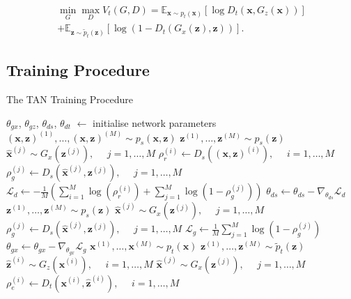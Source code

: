\documentclass{article}
\begin{document}
\begin{equation}
\begin{split}
\min_{G} \max_{D} V_t(G, D) = \mathbb{E}_{\bm{x}\sim p_{t}(\bm{x})}[\log D_t(\bm{x}, G_z(\bm{x}))]\\
+  \mathbb{E}_{\bm{z}\sim \widetilde{p}_{t}(\bm{z})}[\log (1 - D_t(G_x(\bm{z}), \bm{z}))].
\end{split}
\end{equation}

\subsection{Training Procedure}

\begin{algorithm}[tb]
   \caption{The TAN Training Procedure}
   \label{alg:example}
\begin{algorithmic}
   \STATE $\theta_{gx}$, $\theta_{gz}$, $\theta_{ds}$, $\theta_{dt}$ $\leftarrow$ initialise network parameters
   \REPEAT
   		\STATE $(\bm{x},\bm{z})^{(1)}, \dots, (\bm{x},\bm{z})^{(M)} \sim p_s(\bm{x},\bm{z})$ 
		\STATE $\bm{z}^{(1)}, \dots, \bm{z}^{(M)} \sim p_s(\bm{z})$
		\STATE $\hat{\bm{x}}^{(j)} \sim G_x \left(\bm{z}^{(j)}\right), \ \ \ \ \ \ j = 1, \dots, M $ 
		\STATE $\rho_r^{(i)} \leftarrow D_s\left((\bm{x},\bm{z})^{(i)}\right), \ \ \ \ \ \ i = 1, \dots, M $ 
		\STATE $\rho_g^{(j)} \leftarrow D_s\left(\hat{\bm{x}}^{(j)}, \bm{z}^{(j)}\right), \ \ \ \ \ \ j = 1, \dots, M $
		\STATE $\mathcal{L}_d \leftarrow -\frac{1}{M} \left( \sum_{i=1}^{M} \log \left( \rho_r^{(i)} \right) + \sum_{j=1}^{M} \log \left( 1 - \rho_g^{(j)} \right) \right)$
		\STATE $\theta_{ds} \leftarrow \theta_{ds} - \nabla_{\theta_{ds}}\mathcal{L}_d$
	\ENDFOR
	\STATE $\bm{z}^{(1)}, \dots, \bm{z}^{(M)} \sim p_s(\bm{z})$
	\STATE $\hat{\bm{x}}^{(j)} \sim G_x \left(\bm{z}^{(j)}\right), \ \ \ \ \ \ j = 1, \dots, M $ 
	\STATE $\rho_g^{(j)} \leftarrow D_s\left(\hat{\bm{x}}^{(j)}, \bm{z}^{(j)}\right), \ \ \ \ \ \ j = 1, \dots, M $
	\STATE $\mathcal{L}_g \leftarrow \frac{1}{M} \sum_{j=1}^{M} \log \left(1 - \rho_g^{(j)} \right)$
	\STATE $\theta_{gx} \leftarrow \theta_{gx} - \nabla_{\theta_{gx}}\mathcal{L}_g$
	\ENDFOR
   	\STATE $\bm{x}^{(1)}, \dots, \bm{x}^{(M)} \sim p_t(\bm{x})$ 
	\STATE $\bm{z}^{(1)}, \dots, \bm{z}^{(M)} \sim \widetilde{p}_t(\bm{z})$
	\STATE $\hat{\bm{z}}^{(i)} \sim G_z \left( \bm{x}^{(i)}\right), \ \ \ \ \ \ i = 1, \dots, M $ 
	\STATE $\hat{\bm{x}}^{(j)} \sim G_x \left( \bm{z}^{(j)}\right), \ \ \ \ \ \ j = 1, \dots, M $
	\STATE $\rho_e^{(i)} \leftarrow D_t(\bm{x}^{(i)}, \hat{\bm{z}}^{(i)}), \ \ \ \ \ \ i = 1, \dots, M $ 

\end{algorithmic}
\end{algorithm}
\end{document}
